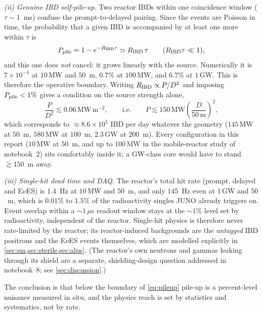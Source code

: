 \documentclass[aps,prd,superscriptaddress,nofootinbib,longbibliography,notitlepage,11pt]{revtex4-2}
\newcommand{\eves}{E$\nu$ES}
\begin{document}
\emph{(ii) Genuine IBD self-pile-up.}  Two reactor IBDs within one coincidence window
($\tau\sim1$~ms) confuse the prompt-to-delayed pairing.  Since the events are Poisson in
time, the probability that a given IBD is accompanied by at least one more within $\tau$ is
\begin{equation}
P_{\rm pile}=1-e^{-R_{\rm IBD}\tau}\simeq R_{\rm IBD}\,\tau
\qquad(R_{\rm IBD}\tau\ll1),
\label{eq:selfpile}
\end{equation}
and this one does \emph{not} cancel: it grows linearly with the source.  Numerically it is
$7\times10^{-4}$ at $10\,\mathrm{MW}$ and $50$~m, $0.7\%$ at $100\,\mathrm{MW}$, and $6.7\%$
at $1\,\mathrm{GW}$.  This is therefore the operative boundary.  Writing
$R_{\rm IBD}\propto P/D^{2}$ and imposing $P_{\rm pile}<1\%$ gives a condition on the source
strength alone,
\begin{equation}
    \frac{P}{D^2}\lesssim 0.06\,\mathrm{MW\,m^{-2}}, \qquad\text{i.e.}\qquad
    P\lesssim 150\,\mathrm{MW}\left(\frac{D}{50\,\mathrm{m}}\right)^2,
\label{eq:pileup}
\end{equation}
which corresponds to $\approx8.6\times10^5$ IBD per day whatever the geometry
($145\,\mathrm{MW}$ at $50$~m, $580\,\mathrm{MW}$ at $100$~m, $2.3\,\mathrm{GW}$ at $200$~m).
Every configuration in this report ($10\,\mathrm{MW}$ at $50$~m, and up to $100\,\mathrm{MW}$
in the mobile-reactor study of notebook~2) sits comfortably inside it; a GW-class core would
have to stand $\gtrsim150$~m away.

\emph{(iii) Single-hit dead time and DAQ.}  The reactor's total hit rate (prompt, delayed
and \eves) is $1.4$~Hz at $10\,\mathrm{MW}$ and $50$~m, and only $145$~Hz even at
$1\,\mathrm{GW}$ and $50$~m, which is $0.01\%$ to $1.5\%$ of the radioactivity singles JUNO
already triggers on.  Event overlap within a $\sim1\,\mu$s readout window stays at the
$\sim1\%$ level set by radioactivity, independent of the reactor.  Single-hit physics is
therefore never rate-limited by the reactor; its reactor-induced backgrounds are the
\emph{untagged} IBD positrons and the \eves{} events themselves, which are modelled
explicitly in \cref{sec:sm,sec:sterile,sec:alps}.  (The reactor's own neutrons and gammas
leaking through its shield are a separate, shielding-design question addressed in
notebook~8; see \cref{sec:discussion}.)

The conclusion is that below the boundary of \cref{eq:pileup} pile-up is a percent-level
nuisance measured in situ, and the physics reach is set by statistics and systematics, not
by rate.
\end{document}
